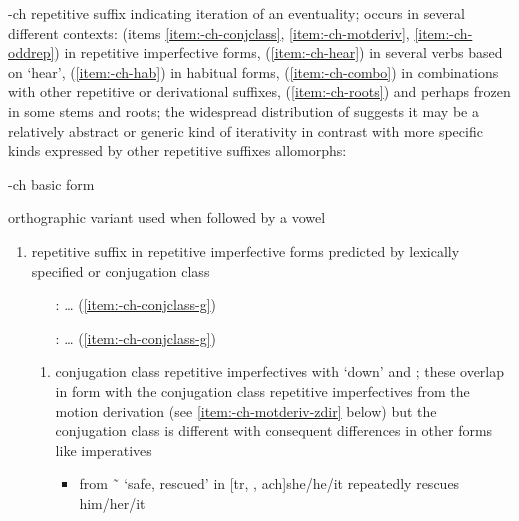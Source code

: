 \begin{morphdesc}[resume*=alphalist]
\item[-ch]\label{m:-ch}
	repetitive suffix indicating iteration of an eventuality;
	occurs in several different contexts:
		(items \ref{item:-ch-conjclass}, \ref{item:-ch-motderiv}, \ref{item:-ch-oddrep})
		in repetitive imperfective forms,
		(\ref{item:-ch-hear}) in several verbs based on  ‘hear’,
		(\ref{item:-ch-hab}) in habitual forms,
		(\ref{item:-ch-combo}) in combinations with other repetitive or derivational suffixes,
		(\ref{item:-ch-roots}) and perhaps frozen in some stems and roots;
	the widespread distribution of 	suggests it may be a
		relatively abstract or generic kind of iterativity
		in contrast with more specific kinds expressed by other
		repetitive suffixes
	\newline
	allomorphs:
	\begin{allolist}
	\item[-ch]	basic form
	\item[\X{-j}]	orthographic variant used when followed by a vowel
	\end{allolist}
	\begin{enumerate}
	\item	\label{item:-ch-conjclass}
		repetitive suffix in repetitive imperfective forms
		predicted by lexically specified  or  conjugation class
		\begin{itemize}
		\item[\fm{g̱}:]	… (\ref{item:-ch-conjclass-g̱})
		\item[\fm{g}:]	… (\ref{item:-ch-conjclass-g})
		\end{itemize}
		\begin{enumerate}
		\item	\label{item:-ch-conjclass-g̱}
			 conjugation class repetitive imperfectives
				with  ‘down’ and ;
			these overlap in form with the  conjugation class
				 repetitive imperfectives
				from the motion derivation
				(see \ref{item:-ch-motderiv-zdir} below)
				but the conjugation class is different with consequent differences
				in other forms like imperatives
			\begin{itemize}
			\item	{}
				from  \~\  ‘safe, rescued’ in
				\newline
				[tr, , ach]{she/he/it repeatedly rescues him/her/it}

\end{itemize}
\end{enumerate}
\end{enumerate}
\end{morphdesc}
